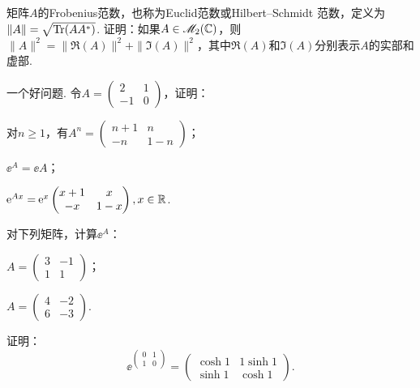 \begin{problem}[矩阵形式的勾股定理]
  矩阵$A$的{\kaishu Frobenius}范数，也称为{\kaishu Euclid}范数或{\kaishu Hilbert--Schmidt} 范数，定义为$\|A\|=\sqrt{\operatorname{Tr}(AA^\ast)}$. 证明：如果$A\in\mathscr M_2(\mathbb C)$，则$\|A\|^2=\|\Re(A)\|^2+\|\Im(A)\|^2$，其中$\Re(A)$和$\Im(A)$分别表示$A$的实部和虚部.
\end{problem}

\begin{problem}
  一个{\kaishu 好问题}. 令$A=\begin{pmatrix}
    2 & 1 \\
    -1 & 0
  \end{pmatrix}$，证明：
  \begin{enum}
    \item\label{prob4.17.a} 对$n\ge1$，有$A^n=\begin{pmatrix}
      n + 1 & n \\
      -n & 1 - n
    \end{pmatrix}
    $；
    \item\label{prob4.17.b} $\ee^A=\ee A$；
    \item\label{prob4.17.c} $\operatorname{\!\!\;\mathrm e}^{Ax}=\operatorname{\!\!\;\mathrm e}^x\begin{pmatrix}
      x + 1 & x \\
      -x & 1-x
    \end{pmatrix},x\in\mathbb R$.
  \end{enum}
\end{problem}

\begin{problem}
  对下列矩阵，计算$\ee^A$：
  \begin{enum}
    \item $A=\begin{pmatrix}
      3 & -1 \\
      1 & 1
    \end{pmatrix}$；
    \item $A=\begin{pmatrix}
      4 & -2 \\
      6 & -3
    \end{pmatrix}$.
  \end{enum}
\end{problem}

\begin{problem}
  证明：
  \[
    \ee^{\begin{pmatrix}
      0 & 1 \\
      1 & 0
    \end{pmatrix}} = \begin{pmatrix}
      \cosh 1 & 1\sinh 1 \\
      \sinh 1 & \cosh 1
    \end{pmatrix}.
  \]
\end{problem}


